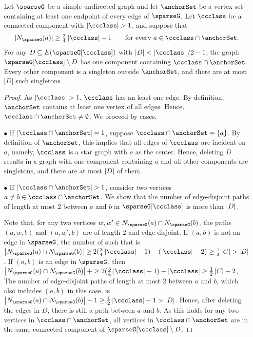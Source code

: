 \begin{lemma} \label{lem:labelsync.robust.components}
Let $ \sparseG $ be a simple undirected graph and let $ \anchorSet $ be a vertex set containing at least one endpoint of every edge of $ \sparseG $.
Let $ \ccclass $ be a connected component with $ \card{\ccclass}>1 $, and suppose that
\[
  |\openN{\sparseG}{a}|\ge\tfrac34\card{\ccclass}-1
  \qquad\text{for every }a\in \ccclass\cap\anchorSet.
\]
For any $ D\subseteq E(\sparseG[\ccclass]) $ with $ |D|<\card{\ccclass}/2-1 $, the graph $ \sparseG[\ccclass]\setminus D $ has one component containing $ \ccclass\cap\anchorSet $.
Every other component is a singleton outside $ \anchorSet $, and there are at most $ |D| $ such singletons.
\end{lemma}
\begin{proof}
    As $ \card{\ccclass} > 1 $, $ \ccclass $ has an least one edge.
    By definition, $ \anchorSet $ contains at least one vertex of all edges.
    Hence, $ \ccclass \cap \anchorSet \neq \emptyset $.
    We proceed by cases.

    $ \bullet $ If $ \card{\ccclass \cap \anchorSet} = 1 $, suppose $ \ccclass \cap \anchorSet = \{ a \} $.
    By definition of $ \anchorSet $, this implies that all edges of $ \ccclass $ are incident on $ a $, namely, $ \ccclass $ is a star graph with $ a $ as the center.
    Hence, deleting $ D $ results in a graph with one component containing $ a $ and all other components are singletons, and there are at most $ \left\lvert D \right \rvert $ of them.

    $ \bullet $ If $ \card{\ccclass \cap \anchorSet} > 1 $, consider two vertices $ a \neq b \in \ccclass \cap \anchorSet $. We show that the number of edge-disjoint paths of length at most $ 2 $ between $ a $ and $ b $ in $ \sparseG[\ccclass] $ is more than $ \left\lvert D \right \rvert $.

    Note that, for any two vertices $ w, w' \in \openN{\sparseG}{a} \cap \openN{\sparseG}{b} $, the paths $ (a,w,b) $ and $ (a,w',b) $ are of length $ 2 $ and edge-disjoint.
    If $ (a,b) $ is not an edge in $ \sparseG $, the number of such that is $ \card{\openN{\sparseG}{a} \cap \openN{\sparseG}{b}} \geq 2(\frac{3}{4}\card{\ccclass}-1) - (\card{\ccclass} - 2) \geq \frac{1}{2}\card{C} > \card{D} $.
    If $ (a,b) $ is an edge in $ \sparseG $, then $ \card{\openN{\sparseG}{a} \cap \openN{\sparseG}{b}} + \geq 2(\frac{3}{4}\card{\ccclass}-1) - \card{\ccclass} \geq \frac{1}{2}\card{C} - 2 $.
    The number of edge-disjoint paths of length at most $ 2 $ between $ a $ and $ b $, which also includes $ (a,b) $ in this case, is $ \card{\openN{\sparseG}{a} \cap \openN{\sparseG}{b}} + 1 \geq \frac{1}{2}\card{\ccclass} - 1 > \card{D} $.
    Hence, after deleting the edges in $ D $, there is still a path between $ a $ and $ b $.
    As this holds for any two vertices in $ \ccclass \cap \anchorSet $, all vertices in $ \ccclass \cap \anchorSet $ are in the same connected component of $ \sparseG[\ccclass]\setminus D $.


\end{proof}

